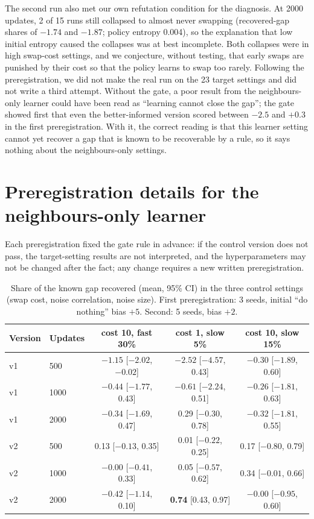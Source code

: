 \documentclass[11pt]{article}
\begin{document}
The second run also met our own refutation condition for the diagnosis.
At 2000 updates, 2 of 15 runs still collapsed to almost never swapping (recovered-gap shares of $-1.74$ and $-1.87$; policy entropy 0.004), so the explanation that low initial entropy caused the collapses was at best incomplete.
Both collapses were in high swap-cost settings, and we conjecture, without testing, that early swaps are punished by their cost so that the policy learns to swap too rarely.
Following the preregistration, we did not make the real run on the 23 target settings and did not write a third attempt.
Without the gate, a poor result from the neighbours-only learner could have been read as ``learning cannot close the gap''; the gate showed first that even the better-informed version scored between $-2.5$ and $+0.3$ in the first preregistration.
With it, the correct reading is that this learner setting cannot yet recover a gap that is known to be recoverable by a rule, so it says nothing about the neighbours-only settings.

\section{Preregistration details for the neighbours-only learner}
\label{app:mappo}

Each preregistration fixed the gate rule in advance: if the control version does not pass, the target-setting results are not interpreted, and the hyperparameters may not be changed after the fact; any change requires a new written preregistration.

\begin{table}[ht]
\centering
\footnotesize
\caption{Share of the known gap recovered (mean, 95\% CI) in the three control settings (swap cost, noise correlation, noise size). First preregistration: 3 seeds, initial ``do nothing'' bias $+5$. Second: 5 seeds, bias $+2$.}
\label{tab:mappo}
\begin{tabular}{@{}llccc@{}}
\toprule
Version & Updates & cost 10, fast 30\% & cost 1, slow 5\% & cost 10, slow 15\% \\
\midrule
v1 & 500 & $-1.15$ [$-2.02$, $-0.02$] & $-2.52$ [$-4.57$, 0.43] & $-0.30$ [$-1.89$, 0.60] \\
v1 & 1000 & $-0.44$ [$-1.77$, 0.43] & $-0.61$ [$-2.24$, 0.51] & $-0.26$ [$-1.81$, 0.63] \\
v1 & 2000 & $-0.34$ [$-1.69$, 0.47] & 0.29 [$-0.30$, 0.78] & $-0.32$ [$-1.81$, 0.55] \\
v2 & 500 & 0.13 [$-0.13$, 0.35] & 0.01 [$-0.22$, 0.25] & 0.17 [$-0.80$, 0.79] \\
v2 & 1000 & $-0.00$ [$-0.41$, 0.33] & 0.05 [$-0.57$, 0.62] & 0.34 [$-0.01$, 0.66] \\
v2 & 2000 & $-0.42$ [$-1.14$, 0.10] & \textbf{0.74} [0.43, 0.97] & $-0.00$ [$-0.95$, 0.60] \\
\bottomrule
\end{tabular}
\end{table}
\end{document}
